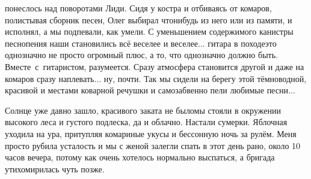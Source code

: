 \noindent\mdash понеслось над поворотами Лиди. Сидя у костра и отбиваясь от комаров, полистывая сборник песен, Олег выбирал что\sdash нибудь из него или из памяти, и исполнял, а мы подпевали, как умели. С уменьшением содержимого канистры песнопения наши становились всё веселее и веселее$\ldots$ гитара в походе\mdash это однозначно не просто огромный плюс, а то, что однозначно должно быть. Вместе~с~гитаристом, разумеется. Сразу атмосфера становится другой и даже на комаров сразу наплевать$\ldots$ ну, почти. Так мы сидели на берегу этой тёмноводной, красивой и местами коварной речушки и самозабвенно пели любимые песни$\ldots$

Солнце уже давно зашло, красивого заката не было\mdash мы стояли в окружении высокого леса и густого подлеска, да и облачно. Настали сумерки. Яблочная уходила на ура, притупляя комариные укусы и бессонную ночь за рулём. Меня просто рубила усталость и мы с женой залегли спать в этот день рано, около 10 часов вечера, потому как очень хотелось нормально выспаться, а бригада утихомирилась чуть позже.

\begin{center}
\end{center}
